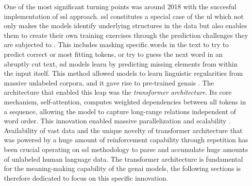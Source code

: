 
One of the most significant turning points was around 2018 with the succesful implementation of \gls{ssl} approach. \Gls{ssl} constitutes a special case of the \gls{ul} which not only makes the models identify underlying structures in the data but also enables them to create their own training exercises through the prediction challenges they are subjected to \parencite[129]{manning2022a}. This includes masking specific words in the text to try to predict correct or most fitting tokens, or try to guess the next word in an abruptly cut text, \gls{ssl} models learn by predicting missing elements from within the input itself. This method allowed models to learn linguistic regularities from massive unlabeled corpora, and it gave rise to pre-trained \glspl{genai} \parencite{maas2023}. The architecture that enabled this leap was the \textit{transformer architecture}. Its core mechanism, self-attention, computes weighted dependencies between all tokens in a sequence, allowing the model to capture long-range relations independent of word order. This innovation enabled massive parallelization and scalability \parencite{maas2023}. Availability of vast data and the unique novelty of transformer architecture that was powered by a huge amount of reinforcement capability through repetition has been crucial operating on \gls{ssl} methodology to parse and accumulate huge amounts of unlabeled human language data. The transformer architecture is fundamental for the meaning-making capability of the \gls{genai} models, the following sections is therefore dedicated to focus on this specific innovation.







